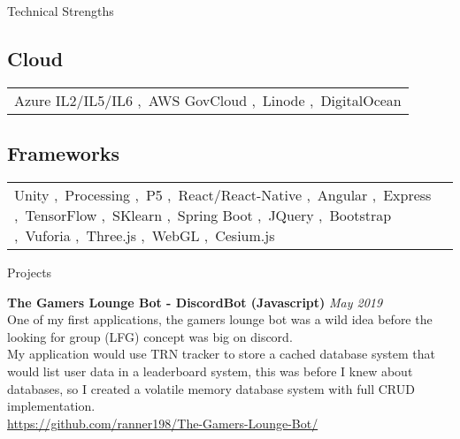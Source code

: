 \documentclass[
	11pt, %
]{crumpcv} %
\begin{document}
\begin{rSection}{Technical Strengths}
\vspace{1em}

\subsection*{Cloud}
\begin{tabular}{@{} p{} @{}}
    Azure IL2/IL5/IL6 \sep\ AWS GovCloud \sep\ Linode \sep\ DigitalOcean
\end{tabular}

\vspace{1em}

\subsection*{Frameworks}
\begin{tabular}{@{} p{} @{}}
    Unity \sep\ Processing \sep\ P5 \sep\ React/React-Native \sep\ Angular \sep\ Express \sep\ TensorFlow \sep\ SKlearn \sep\ Spring Boot \sep\ JQuery \sep\ Bootstrap \sep\ Vuforia \sep\ Three.js \sep\ WebGL \sep\ Cesium.js
\end{tabular}

\end{rSection}

\vspace{2em} %


\begin{rSection}{Projects}

	\textbf{The Gamers Lounge Bot - DiscordBot (Javascript)} \hfill \textit{May 2019} \\ 
		One of my first applications, the gamers lounge bot was a wild idea before the looking for group (LFG) concept was big on discord. \\
		My application would use TRN tracker to store a cached database system that would list user data in a leaderboard system, this was before I knew about databases, so I created a volatile memory database system with full CRUD implementation. \\
		\href{https://github.com/Ranner198/The-Gamers-Lounge-Bot/tree/master}{https://github.com/ranner198/The-Gamers-Lounge-Bot/} \\

\end{rSection}
\end{document}
